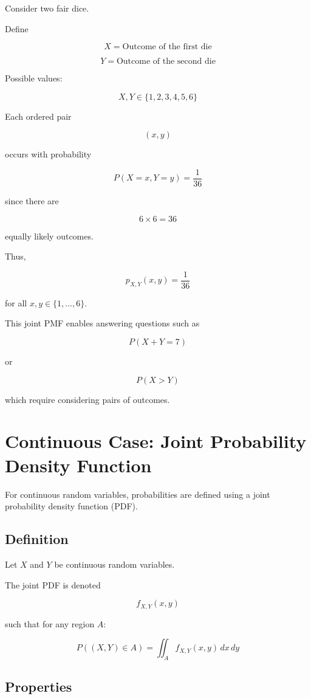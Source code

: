 \documentclass[12pt]{article}
\begin{document}
Consider two fair dice.

Define

\[
X = \text{Outcome of the first die}
\]

\[
Y = \text{Outcome of the second die}
\]

Possible values:

\[
X,Y \in \{1,2,3,4,5,6\}
\]

Each ordered pair

\[
(x,y)
\]

occurs with probability

\[
P(X=x,Y=y) = \frac{1}{36}
\]

since there are

\[
6 \times 6 = 36
\]

equally likely outcomes.

Thus,

\[
p_{X,Y}(x,y) = \frac{1}{36}
\]

for all $x,y \in \{1,\dots,6\}$.

This joint PMF enables answering questions such as

\[
P(X+Y=7)
\]

or

\[
P(X>Y)
\]

which require considering pairs of outcomes.

\section{Continuous Case: Joint Probability Density Function}

For continuous random variables, probabilities are defined using a joint probability density function (PDF).

\subsection{Definition}

Let $X$ and $Y$ be continuous random variables.

The joint PDF is denoted

\[
f_{X,Y}(x,y)
\]

such that for any region $A$:

\[
P((X,Y)\in A) = \iint_A f_{X,Y}(x,y)\,dx\,dy
\]

\subsection{Properties}
\end{document}
